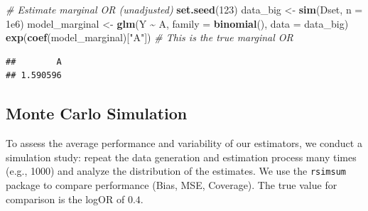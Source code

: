 \documentclass[
]{article}
\newenvironment{Shaded}{\begin{snugshade}}{\end{snugshade}}
\newcommand{\AttributeTok}[1]{\textcolor[rgb]{0.13,0.29,0.53}{#1}}
\newcommand{\CommentTok}[1]{\textcolor[rgb]{0.56,0.35,0.01}{\textit{#1}}}
\newcommand{\DecValTok}[1]{\textcolor[rgb]{0.00,0.00,0.81}{#1}}
\newcommand{\FloatTok}[1]{\textcolor[rgb]{0.00,0.00,0.81}{#1}}
\newcommand{\FunctionTok}[1]{\textcolor[rgb]{0.13,0.29,0.53}{\textbf{#1}}}
\newcommand{\NormalTok}[1]{#1}
\newcommand{\OtherTok}[1]{\textcolor[rgb]{0.56,0.35,0.01}{#1}}
\newcommand{\SpecialCharTok}[1]{\textcolor[rgb]{0.81,0.36,0.00}{\textbf{#1}}}
\newcommand{\StringTok}[1]{\textcolor[rgb]{0.31,0.60,0.02}{#1}}
\begin{document}
\begin{Shaded}
\begin{Highlighting}[]
\CommentTok{\# Estimate marginal OR (unadjusted)}
\FunctionTok{set.seed}\NormalTok{(}\DecValTok{123}\NormalTok{)}
\NormalTok{data\_big }\OtherTok{\textless{}{-}} \FunctionTok{sim}\NormalTok{(Dset, }\AttributeTok{n =} \FloatTok{1e6}\NormalTok{)}
\NormalTok{model\_marginal }\OtherTok{\textless{}{-}} \FunctionTok{glm}\NormalTok{(Y }\SpecialCharTok{\textasciitilde{}}\NormalTok{ A, }\AttributeTok{family =} \FunctionTok{binomial}\NormalTok{(), }\AttributeTok{data =}\NormalTok{ data\_big)}
\FunctionTok{exp}\NormalTok{(}\FunctionTok{coef}\NormalTok{(model\_marginal)[}\StringTok{"A"}\NormalTok{])  }\CommentTok{\# This is the true marginal OR}
\end{Highlighting}
\end{Shaded}

\begin{verbatim}
##        A 
## 1.590596
\end{verbatim}

\subsection{Monte Carlo Simulation}\label{monte-carlo-simulation}

To assess the average performance and variability of our estimators, we
conduct a simulation study: repeat the data generation and estimation
process many times (e.g., 1000) and analyze the distribution of the
estimates. We use the \texttt{rsimsum} package to compare performance
(Bias, MSE, Coverage). The true value for comparison is the logOR of
\(0.4\).
\end{document}
